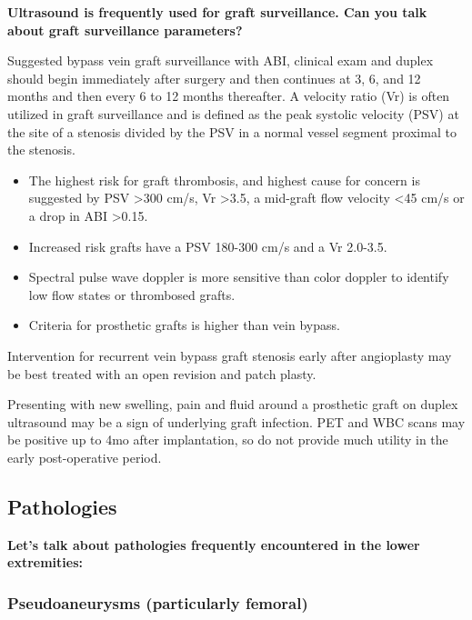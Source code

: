 \documentclass[
]{book}
\begin{document}
\textbf{Ultrasound is frequently used for graft surveillance. Can you talk
about graft surveillance parameters?}

Suggested bypass vein graft surveillance with ABI, clinical exam and
duplex should begin immediately after surgery and then continues at 3,
6, and 12 months and then every 6 to 12 months thereafter.\citep{conte2006, zierler2018} A velocity ratio (Vr) is often utilized in graft
surveillance and is defined as the peak systolic velocity (PSV) at the
site of a stenosis divided by the PSV in a normal vessel segment
proximal to the stenosis.

\begin{itemize}
\item
  The highest risk for graft thrombosis, and highest cause for concern
  is suggested by PSV \textgreater300 cm/s, Vr \textgreater3.5, a mid-graft flow velocity
  \textless45 cm/s or a drop in ABI \textgreater0.15.
  \citep{bandykHemodynamicsVeinGraft1988, zierler2018}
\item
  Increased risk grafts have a PSV 180-300 cm/s and a Vr 2.0-3.5.
\item
  Spectral pulse wave doppler is more sensitive than color doppler to
  identify low flow states or thrombosed grafts.\citep{hedrick2005}
\item
  Criteria for prosthetic grafts is higher than vein bypass.
  \citep{zierler2018}
\end{itemize}

Intervention for recurrent vein bypass graft stenosis early after
angioplasty may be best treated with an open revision and patch
plasty.\citep{jongsma2016}

Presenting with new swelling, pain and fluid around a prosthetic graft
on duplex ultrasound may be a sign of underlying graft infection. PET
and WBC scans may be positive up to 4mo after implantation, so do not
provide much utility in the early post-operative period.\citep{puges2019}

\hypertarget{pathologies}{%
\subsection{Pathologies}\label{pathologies}}

\textbf{Let's talk about pathologies frequently encountered in the lower
extremities:}

\hypertarget{psa}{%
\subsubsection{Pseudoaneurysms (particularly femoral)}\label{psa}}
\end{document}
